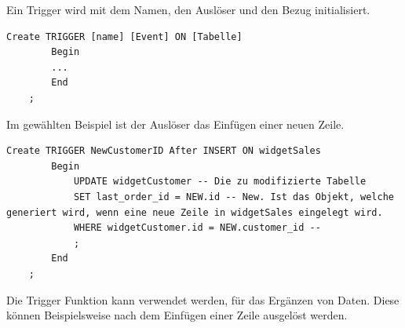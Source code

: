Ein Trigger wird mit dem Namen, den Auslöser und den Bezug initialisiert.
\begin{lstlisting}[style=SQL]
	Create TRIGGER [name] [Event] ON [Tabelle]
		Begin
		...
		End
	;
\end{lstlisting}

Im gewählten Beispiel ist der Auslöser das Einfügen einer neuen Zeile.
\begin{lstlisting}[style=SQL]
	Create TRIGGER NewCustomerID After INSERT ON widgetSales
		Begin
			UPDATE widgetCustomer -- Die zu modifizierte Tabelle
			SET last_order_id = NEW.id -- New. Ist das Objekt, welche generiert wird, wenn eine neue Zeile in widgetSales eingelegt wird.
			WHERE widgetCustomer.id = NEW.customer_id --
			;
		End
	;
\end{lstlisting}

Die Trigger Funktion kann verwendet werden, für das Ergänzen von Daten. Diese können Beispielsweise nach dem Einfügen einer Zeile ausgelöst werden.

